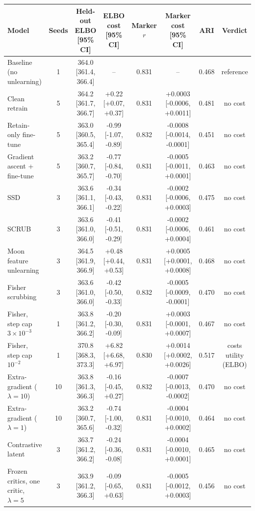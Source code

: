 \begin{tabular}{lccccccc}
\toprule
Model & Seeds & Held-out ELBO [95\% CI] & ELBO cost [95\% CI] & Marker $r$ & Marker cost [95\% CI] & ARI & Verdict \\
\midrule
Baseline (no unlearning) & 1 & 364.0 [361.4, 366.4] & -- & 0.831 & -- & 0.468 & reference \\
Clean retrain & 5 & 364.2 [361.7, 366.7] & +0.22 [+0.07, +0.37] & 0.831 & +0.0003 [-0.0006, +0.0011] & 0.481 & no cost \\
Retain-only fine-tune & 5 & 363.0 [360.5, 365.4] & -0.99 [-1.07, -0.89] & 0.832 & -0.0008 [-0.0014, -0.0001] & 0.451 & no cost \\
Gradient ascent + fine-tune & 5 & 363.2 [360.7, 365.7] & -0.77 [-0.84, -0.70] & 0.831 & -0.0005 [-0.0011, +0.0001] & 0.463 & no cost \\
SSD & 3 & 363.6 [361.1, 366.1] & -0.34 [-0.43, -0.22] & 0.831 & -0.0002 [-0.0006, +0.0003] & 0.475 & no cost \\
SCRUB & 3 & 363.6 [361.0, 366.0] & -0.41 [-0.51, -0.29] & 0.831 & -0.0002 [-0.0006, +0.0004] & 0.461 & no cost \\
Moon feature unlearning & 3 & 364.5 [361.9, 366.9] & +0.48 [+0.44, +0.53] & 0.831 & +0.0005 [+0.0001, +0.0008] & 0.468 & no cost \\
Fisher scrubbing & 3 & 363.6 [361.0, 366.0] & -0.42 [-0.50, -0.33] & 0.832 & -0.0005 [-0.0009, -0.0001] & 0.470 & no cost \\
Fisher, step cap $3\times 10^{-3}$ & 1 & 363.8 [361.2, 366.2] & -0.20 [-0.30, -0.09] & 0.831 & +0.0003 [-0.0001, +0.0007] & 0.467 & no cost \\
Fisher, step cap $10^{-2}$ & 1 & 370.8 [368.3, 373.3] & +6.82 [+6.68, +6.97] & 0.830 & +0.0014 [+0.0002, +0.0026] & 0.517 & costs utility (ELBO) \\
Extra-gradient ($\lambda=10$) & 10 & 363.8 [361.3, 366.3] & -0.16 [-0.45, +0.27] & 0.832 & -0.0007 [-0.0013, -0.0002] & 0.470 & no cost \\
Extra-gradient ($\lambda=1$) & 10 & 363.2 [360.7, 365.6] & -0.74 [-1.00, -0.32] & 0.831 & -0.0004 [-0.0010, +0.0002] & 0.464 & no cost \\
Contrastive latent & 3 & 363.7 [361.2, 366.2] & -0.24 [-0.36, -0.08] & 0.831 & -0.0004 [-0.0010, +0.0001] & 0.465 & no cost \\
Frozen critics, one critic, $\lambda=5$ & 3 & 363.9 [361.2, 366.3] & -0.09 [-0.65, +0.63] & 0.831 & -0.0005 [-0.0012, +0.0003] & 0.456 & no cost \\

\end{tabular}
